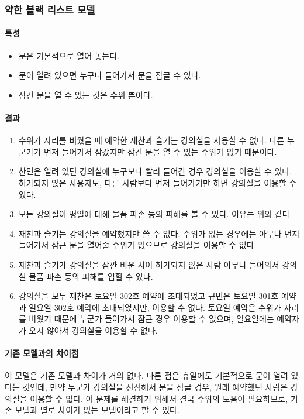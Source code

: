 \documentclass[11pt,a4paper]{article}
\begin{document}
\subsubsection{약한 블랙 리스트 모델}

\paragraph{특성}
\begin{itemize}
\item 문은 기본적으로 열어 놓는다.
\item 문이 열려 있으면 누구나 들어가서 문을 잠글 수 있다.
\item 잠긴 문을 열 수 있는 것은 수위 뿐이다.
\end{itemize}

\paragraph{결과}
\begin{enumerate}
\item 수위가 자리를 비웠을 때 예약한 재찬과 슬기는 강의실을 사용할 수 없다. 다른 누군가가 먼저 들어가서 잠갔지만 잠긴 문을 열 수 있는 수위가 없기 때문이다.
\item 찬민은 열려 있던 강의실에 누구보다 빨리 들어간 경우 강의실을 이용할 수 있다. 허가되지 않은 사용자도, 다른 사람보다 먼저 들어가기만 하면 강의실을 이용할 수 있다.
\item 모든 강의실이 평일에 대해 물품 파손 등의 피해를 볼 수 있다. 이유는 위와 같다.
\item 재찬과 슬기는 강의실을 예약했지만 쓸 수 없다. 수위가 없는 경우에는 아무나 먼저 들어가서 잠근 문을 열어줄 수위가 없으므로 강의실을 이용할 수 없다.
\item 재찬과 슬기가 강의실을 잠깐 비운 사이 허가되지 않은 사람 아무나 들어와서 강의실 물품 파손 등의 피해를 입힐 수 있다.
\item 강의실을 모두 재찬은 토요일 302호 예약에 초대되었고 규민은 토요일 301호 예약과 일요일 302호 예약에 초대되었지만, 이용할 수 없다. 토요일 예약은 수위가 자리를 비웠기 때문에 누군가 들어가서 잠근 경우 이용할 수 없으며, 일요일에는 예약자가 오지 않아서 강의실을 이용할 수 없다.
\end{enumerate}

\paragraph{기존 모델과의 차이점}
\hfill\break
이 모델은 기존 모델과 차이가 거의 없다. 다른 점은 휴일에도 기본적으로 문이 열려
있다는 것인데, 만약 누군가 강의실을 선점해서 문을 잠글 경우, 원래 예약했던
사람은 강의실을 이용할 수 없다. 이 문제를 해결하기 위해서 결국 수위의 도움이
필요하므로, 기존 모델과 별로 차이가 없는 모델이라고 할 수 있다.
\end{document}
